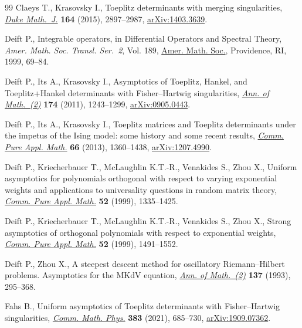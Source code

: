 \documentclass[10pt,a4paper]{amsart}
\numberwithin{equation}{section}
\begin{document}
\begin{thebibliography}{99}
Claeys T., Krasovsky I., Toeplitz determinants with merging singularities,
 \href{https://doi.org/10.1215/00127094-3164897}{\textit{Duke Math.~J.}} \textbf{164} (2015), 2897--2987, \href{https://arxiv.org/abs/1403.3639}{arXiv:1403.3639}.

Deift P., Integrable operators, in Differential {O}perators and {S}pectral
 {T}heory, \textit{Amer. Math. Soc. Transl. Ser.~2}, Vol. 189, \href{https://doi.org/10.1090/trans2/189/06}{Amer. Math.
 Soc.}, Providence, RI, 1999, 69--84.

Deift P., Its A., Krasovsky I., Asymptotics of {T}oeplitz, {H}ankel, and
 {T}oeplitz+{H}ankel determinants with {F}isher--{H}artwig singularities,
 \href{https://doi.org/10.4007/annals.2011.174.2.12}{\textit{Ann. of Math.~(2)}} \textbf{174} (2011), 1243--1299,
 \href{https://arxiv.org/abs/0905.0443}{arXiv:0905.0443}.

Deift P., Its A., Krasovsky I., Toeplitz matrices and {T}oeplitz determinants
 under the impetus of the {I}sing model: some history and some recent results,
 \href{https://doi.org/10.1002/cpa.21467}{\textit{Comm. Pure Appl. Math.}} \textbf{66} (2013), 1360--1438,
 \href{https://arxiv.org/abs/1207.4990}{arXiv:1207.4990}.


Deift P., Kriecherbauer T., McLaughlin K.T.-R., Venakides S., Zhou X., Uniform
 asymptotics for polynomials orthogonal with respect to varying exponential
 weights and applications to universality questions in random matrix theory,
 \href{https://doi.org/10.1002/(SICI)1097-0312(199911)52:11<1335::AID-CPA1>3.0.CO;2-1}{\textit{Comm. Pure Appl. Math.}} \textbf{52} (1999), 1335--1425.

Deift P., Kriecherbauer T., McLaughlin K.T.-R., Venakides S., Zhou X., Strong
 asymptotics of orthogonal polynomials with respect to exponential weights,
 \href{https://doi.org/10.1002/(SICI)1097-0312(199912)52:12<1491::AID-CPA2>3.3.CO;2-R}{\textit{Comm. Pure Appl. Math.}} \textbf{52} (1999), 1491--1552.
 
Deift P., Zhou X., A steepest descent method for oscillatory
 {R}iemann--{H}ilbert problems. {A}symptotics for the {MK}d{V} equation,
 \href{https://doi.org/10.2307/2946540}{\textit{Ann. of Math.~(2)}} \textbf{137} (1993), 295--368.

Fahs B., Uniform asymptotics of {T}oeplitz determinants with
 {F}isher--{H}artwig singularities, \href{https://doi.org/10.1007/s00220-021-03943-0}{\textit{Comm. Math. Phys.}} \textbf{383}
 (2021), 685--730, \href{https://arxiv.org/abs/1909.07362}{arXiv:1909.07362}.


\end{thebibliography}
\end{document}
